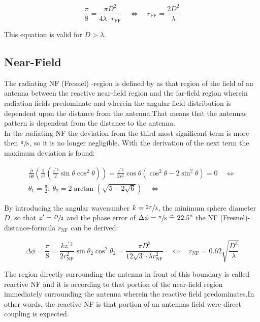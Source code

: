 \begin{equation}
\frac{\pi}{8} = \frac{\pi D^2}{4\lambda\cdot r_{\text{FF}}} \quad \Leftrightarrow \quad r_{\text{FF}} = \frac{2D^2}{\lambda}
\label{eq:ff}
\end{equation}

This equation is valid for $D > \lambda$. \cite{balanis}

\subsection{Near-Field}

The radiating \ac{NF} (Fresnel) -region is defined by \cite{balanis} as \glqq that region of the field of an antenna between the reactive near-field region and the far-field region wherein radiation fields predominate and wherein the angular field distribution is dependent upon the distance from the antenna.\grqq{ }That means that the antennas pattern is dependent from the distance to the antenna.\\
In the radiating \ac{NF} the deviation from the third most significant term is more then $\sfrac{\pi}{8}$, so it is no longer negligible. With the derivation of the next term the maximum deviation is found:

\begin{align}
\frac{\partial}{\partial\theta}\left(\frac{1}{r^2}\left(\frac{z^{\prime\, 3}}{2}\sin\theta\cos^2\theta\right)\right) = \frac{z^{\prime\, 3}}{2r^2}\cos\theta\left(\cos^2\theta-2\sin^2\theta\right) = 0 \quad \Leftrightarrow\\ 
\theta_1 = \frac{\pi}{2},\ \theta_2=2\arctan\left(\sqrt{5-2\sqrt{6}}\right) \quad \Leftrightarrow
\end{align}

By introducing the angular wavenumber $k=\sfrac{2\pi}{\lambda}$, the minimum sphere diameter $D$, so that $z'=\sfrac{D}{2}$ and the phase error of $\Delta\phi = \sfrac{\pi}{8} \ \widehat{=}\  22.5^\circ$ the \ac{NF} (Fresnel)-distance-formula $r_{\text{NF}}$ can be derived:

\begin{equation}
\Delta\phi = \frac{\pi}{8} = \frac{kz^{\prime\, 3}}{2r_{\text{NF}}^2}\sin\theta_2\cos^2\theta_2= \frac{\pi D^3}{12\sqrt{3}\cdot\lambda r_{\text{NF}}^2} \quad \Leftrightarrow \quad r_{\text{NF}}=0.62\sqrt{\frac{D^3}{\lambda}}
\end{equation}

The region directly surrounding the antenna in front of this boundary is called reactive \ac{NF} and it is according to \cite{balanis} \glqq that portion of the near-field region immediately surrounding the antenna wherein the reactive field predominates.\grqq{ }In other words, the reactive \ac{NF} is that portion of an antennas field were direct coupling is expected.

